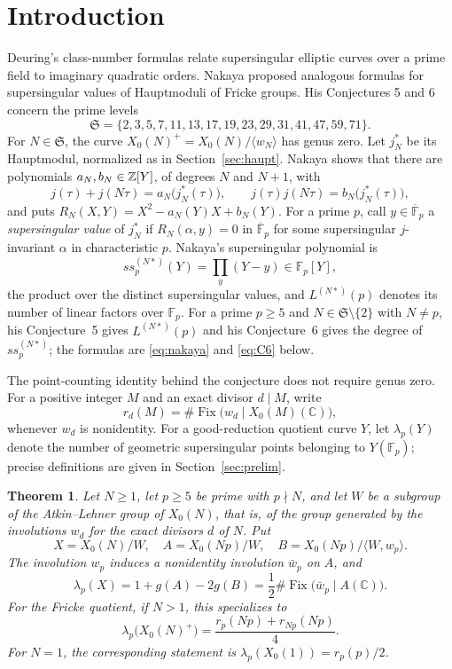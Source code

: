 \documentclass[11pt,a4paper]{article}
\newtheorem{theorem}{Theorem}[section]
\theoremstyle{remark}\newtheorem{remark}[theorem]{Remark}
\numberwithin{equation}{section}
\newcommand{\C}{\mathbb C}\newcommand{\Fp}{\mathbb F_p}
\newcommand{\kk}{\overline{\mathbb F}_p}
\newcommand{\Fix}{\operatorname{Fix}}
\begin{document}
	\section{Introduction}
	Deuring's class-number formulas relate supersingular elliptic curves over a prime field to imaginary quadratic orders. Nakaya \cite{Nakaya} proposed analogous formulas for supersingular values of Hauptmoduli of Fricke groups. His Conjectures 5 and 6 concern the prime levels
	\[
	\mathfrak S=\{2,3,5,7,11,13,17,19,23,29,31,41,47,59,71\}.
	\]
	For $N\in\mathfrak S$, the curve $X_0(N)^+=X_0(N)/\langle w_N\rangle$ has genus zero. Let $j_N^*$ be its Hauptmodul, normalized as in Section~\ref{sec:haupt}. Nakaya \cite[Proposition~4]{Nakaya} shows that there are polynomials $a_N,b_N\in\mathbb Z[Y]$, of degrees $N$ and $N+1$, with
	\[
	j(\tau)+j(N\tau)=a_N\bigl(j_N^*(\tau)\bigr),\qquad j(\tau)j(N\tau)=b_N\bigl(j_N^*(\tau)\bigr),
	\]
	and puts $R_N(X,Y)=X^2-a_N(Y)X+b_N(Y)$. For a prime $p$, call $y\in\kk$ a \emph{supersingular value} of $j_N^*$ if $R_N(\alpha,y)=0$ in $\kk$ for some supersingular $j$-invariant $\alpha$ in characteristic $p$. Nakaya's supersingular polynomial \cite[Section~4]{Nakaya} is
	\[
	ss_p^{(N*)}(Y)=\prod_{y}(Y-y)\in\Fp[Y],
	\]
	the product over the distinct supersingular values, and $L^{(N*)}(p)$ denotes its number of linear factors over $\Fp$. For a prime $p\geq5$ and $N\in\mathfrak S\setminus\{2\}$ with $N\neq p$, his Conjecture~5 gives $L^{(N*)}(p)$ and his Conjecture~6 gives the degree of $ss_p^{(N*)}$; the formulas are \eqref{eq:nakaya} and \eqref{eq:C6} below.
	
	The point-counting identity behind the conjecture does not require genus zero. For a positive integer $M$ and an exact divisor $d\mid M$, write
	\[
	r_d(M)=\#\Fix\bigl(w_d\mid X_0(M)(\C)\bigr),
	\]
	whenever $w_d$ is nonidentity. For a good-reduction quotient curve $Y$, let $\lambda_p(Y)$ denote the number of geometric supersingular points belonging to $Y(\Fp)$; precise definitions are given in Section~\ref{sec:prelim}.
	

	\begin{theorem}\label{thm:main}
		Let $N\geq1$, let $p\geq5$ be prime with $p\nmid N$, and let $W$ be a subgroup of the Atkin--Lehner group of $X_0(N)$, that is, of the group generated by the involutions $w_d$ for the exact divisors $d$ of $N$. Put
		\[
		X=X_0(N)/W,\quad A=X_0(Np)/W,\quad
		B=X_0(Np)/\langle W,w_p\rangle.
		\]
		The involution $w_p$ induces a nonidentity involution $\bar w_p$ on $A$, and
		\begin{equation}\label{eq:general}
			\lambda_p(X)=1+g(A)-2g(B)
			=\frac12\#\Fix\bigl(\bar w_p\mid A(\C)\bigr).
		\end{equation}
		For the Fricke quotient, if $N>1$, this specializes to
		\begin{equation}\label{eq:fricke}
			\lambda_p\bigl(X_0(N)^+\bigr)
			=\frac{r_p(Np)+r_{Np}(Np)}4.
		\end{equation}
		For $N=1$, the corresponding statement is $\lambda_p(X_0(1))=r_p(p)/2$.
	\end{theorem}
	
\end{document}
